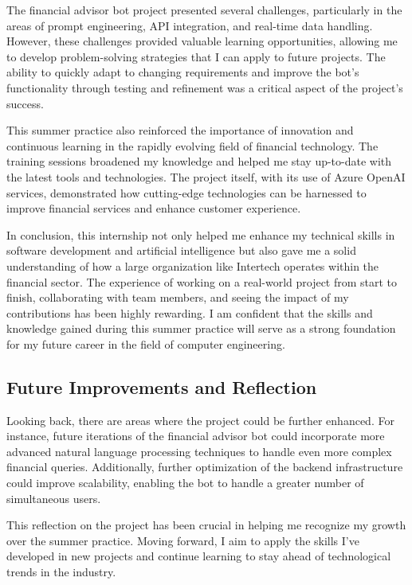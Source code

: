 \documentclass[a4paper,12pt]{report}
\begin{document}
The financial advisor bot project presented several challenges, particularly in the areas of prompt engineering, API integration, and real-time data handling. However, these challenges provided valuable learning opportunities, allowing me to develop problem-solving strategies that I can apply to future projects. The ability to quickly adapt to changing requirements and improve the bot’s functionality through testing and refinement was a critical aspect of the project’s success.

This summer practice also reinforced the importance of innovation and continuous learning in the rapidly evolving field of financial technology. The training sessions broadened my knowledge and helped me stay up-to-date with the latest tools and technologies. The project itself, with its use of Azure OpenAI services, demonstrated how cutting-edge technologies can be harnessed to improve financial services and enhance customer experience.

In conclusion, this internship not only helped me enhance my technical skills in software development and artificial intelligence but also gave me a solid understanding of how a large organization like Intertech operates within the financial sector. The experience of working on a real-world project from start to finish, collaborating with team members, and seeing the impact of my contributions has been highly rewarding. I am confident that the skills and knowledge gained during this summer practice will serve as a strong foundation for my future career in the field of computer engineering.

\subsection*{Future Improvements and Reflection}
Looking back, there are areas where the project could be further enhanced. For instance, future iterations of the financial advisor bot could incorporate more advanced natural language processing techniques to handle even more complex financial queries. Additionally, further optimization of the backend infrastructure could improve scalability, enabling the bot to handle a greater number of simultaneous users.

This reflection on the project has been crucial in helping me recognize my growth over the summer practice. Moving forward, I aim to apply the skills I’ve developed in new projects and continue learning to stay ahead of technological trends in the industry.
\end{document}
